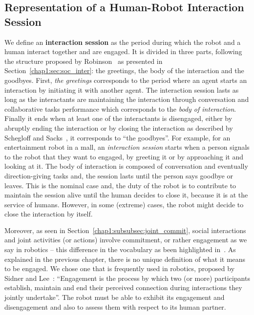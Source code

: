 \documentclass[a4paper,11pt,twoside]{StyleThese}
\begin{document}
\subsection{Representation of a Human-Robot Interaction Session}
We define an \textbf{interaction session} as the period during which the robot and a human interact together and are engaged. It is divided in three parts, following the structure proposed by Robinson~\cite{robinson_overall_2012} as presented in Section~\ref{chap1:sec:soc_inter}: the greetings, the body of the interaction and the goodbyes. First, \textit{the greetings} corresponds to the period where an agent starts an interaction by initiating it with another agent. The interaction session lasts as long as the interactants are maintaining the interaction through conversation and collaborative tasks performance which corresponds to the \textit{body of interaction}. Finally it ends when at least one of the interactants is disengaged, either by abruptly ending the interaction or by closing the interaction as described by Schegloff and Sacks~\cite{schegloff_1973_opening}, it corresponds to ``the goodbyes''. For example, for an entertainment robot in a mall, an \textit{interaction session} starts when a person signals to the robot that they want to engaged, by greeting it or by approaching it and looking at it. The body of interaction is composed of conversation and eventually direction-giving tasks and, the session lasts until the person says goodbye or leaves. This is the nominal case and, the duty of the robot is to contribute to maintain the session alive until the human decides to close it, because it is at the service of humans. However, in some (extreme) cases, the robot might decide to close the interaction by itself.

Moreover, as seen in Section~\ref{chap1:subsubsec:joint_commit}, social interactions and joint activities (or actions) involve commitment, or rather engagement as we say in robotics -- this difference in the vocabulary as been highlighted in~\cite{castro_2019_commitments}. As explained in the previous chapter, there is no unique definition of what it means to be engaged. We chose one that is frequently used in robotics, proposed by Sidner and Lee~\cite{sidner_2003_engagement}: ``Engagement is the process by which two (or more) participants establish, maintain and end their perceived connection during interactions they jointly undertake''. The robot must be able to exhibit its engagement and disengagement and also to assess them with respect to its human partner.
\end{document}
